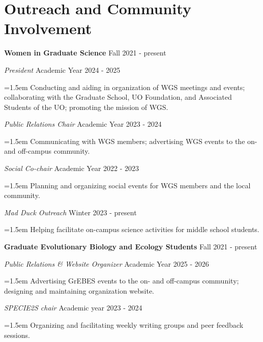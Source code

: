 \documentclass[11pt]{extarticle}
\newcommand{\NewPart}[1]{\section*{{#1}}}
\begin{document}
\NewPart{Outreach and Community Involvement}

\noindent \textbf{Women in Graduate Science}  \hfill Fall 2021 - present \par
\vspace{2mm}
\textit{President} \hfill Academic Year 2024 - 2025 \par
{\narrower \hangindent=1.5em {Conducting and aiding in organization of WGS meetings and events;
                                          collaborating with the Graduate School, UO Foundation, and Associated Students of the UO;
                                          promoting the mission of WGS.} \normalsize \par }
\vspace{1mm}
\textit{Public Relations Chair} \hfill Academic Year 2023 - 2024 \par
{\narrower \hangindent=1.5em {Communicating with WGS members; 
                                        advertising WGS events to the on- and off-campus community.} \normalsize \par }
\vspace{1mm}
\textit{Social Co-chair} \hfill Academic Year 2022 - 2023 \par
{\narrower \hangindent=1.5em {Planning and organizing social events for WGS members and the local community.} \normalsize \par }
\vspace{1mm}
\textit{Mad Duck Outreach} \hfill Winter 2023 - present \par
{\narrower \hangindent=1.5em {Helping facilitate on-campus science activities for middle school students.} \normalsize \par }
\vspace{2.5mm}
\noindent \textbf{Graduate Evolutionary Biology and Ecology Students} \hfill Fall 2021 - present \par
\vspace{2mm}
\textit{Public Relations \& Website Organizer} \hfill Academic Year 2025 - 2026 \par
{\narrower \hangindent=1.5em {Advertising GrEBES events to the on- and off-campus community;
                                          designing and maintaining organization website.} \normalsize \par }
\vspace{1mm}
\textit{SPECIE2S chair} \hfill Academic year 2023 - 2024 \par
{\narrower \hangindent=1.5em {Organizing and facilitating weekly writing groups and peer feedback sessions.} \normalsize \par }
\end{document}
